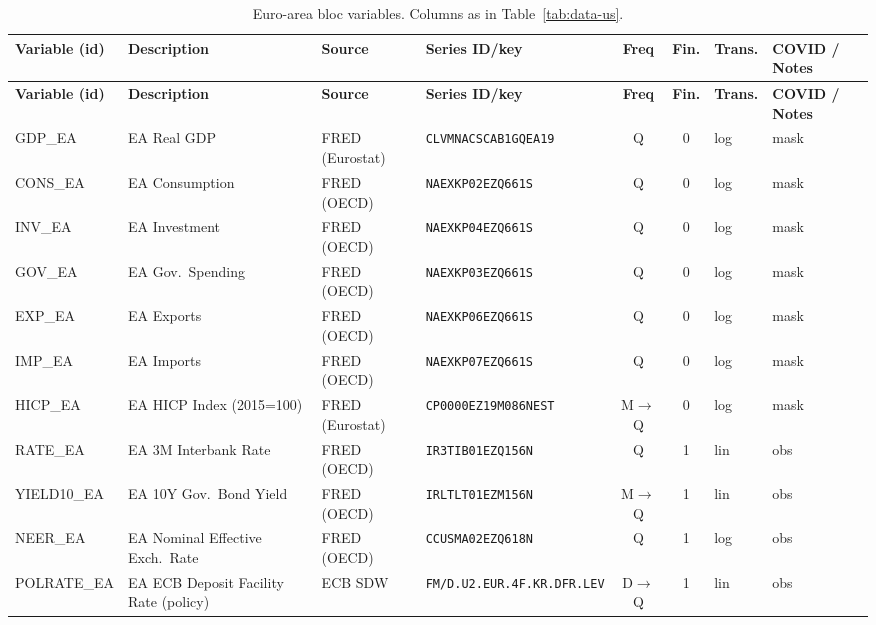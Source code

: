 {\footnotesize\setlength{\tabcolsep}{3.5pt}
\begin{longtable}{@{}>{\raggedright\arraybackslash}p{1.7cm} >{\raggedright\arraybackslash}p{2.7cm} >{\raggedright\arraybackslash}p{1.35cm} >{\raggedright\arraybackslash}p{2.55cm} c c >{\raggedright\arraybackslash}p{0.85cm} >{\raggedright\arraybackslash}p{2.75cm}@{}}
\caption{Euro-area bloc variables. Columns as in
Table~\ref{tab:data-us}.}\label{tab:data-ea}\\
\toprule
\textbf{Variable (id)} & \textbf{Description} & \textbf{Source} & \textbf{Series ID/key} & \textbf{Freq} & \textbf{Fin.} & \textbf{Trans.} & \textbf{COVID / Notes} \\
\midrule
\endfirsthead
\toprule
\textbf{Variable (id)} & \textbf{Description} & \textbf{Source} & \textbf{Series ID/key} & \textbf{Freq} & \textbf{Fin.} & \textbf{Trans.} & \textbf{COVID / Notes} \\
\midrule
\endhead
\bottomrule
\endfoot
GDP\_EA     & EA Real GDP & FRED (Eurostat) & \texttt{CLVMNACSCAB1GQEA19} & Q & 0 & log & mask \\
CONS\_EA    & EA Consumption & FRED (OECD) & \texttt{NAEXKP02EZQ661S} & Q & 0 & log & mask \\
INV\_EA     & EA Investment & FRED (OECD) & \texttt{NAEXKP04EZQ661S} & Q & 0 & log & mask \\
GOV\_EA     & EA Gov.\ Spending & FRED (OECD) & \texttt{NAEXKP03EZQ661S} & Q & 0 & log & mask \\
EXP\_EA     & EA Exports & FRED (OECD) & \texttt{NAEXKP06EZQ661S} & Q & 0 & log & mask \\
IMP\_EA     & EA Imports & FRED (OECD) & \texttt{NAEXKP07EZQ661S} & Q & 0 & log & mask \\
HICP\_EA    & EA HICP Index (2015=100) & FRED (Eurostat) & \texttt{CP0000EZ19M086NEST} & M$\to$Q & 0 & log & mask \\
RATE\_EA    & EA 3M Interbank Rate & FRED (OECD) & \texttt{IR3TIB01EZQ156N} & Q & 1 & lin & obs \\
YIELD10\_EA & EA 10Y Gov.\ Bond Yield & FRED (OECD) & \texttt{IRLTLT01EZM156N} & M$\to$Q & 1 & lin & obs \\
NEER\_EA    & EA Nominal Effective Exch.\ Rate & FRED (OECD) & \texttt{CCUSMA02EZQ618N} & Q & 1 & log & obs \\
POLRATE\_EA & EA ECB Deposit Facility Rate (policy) & ECB SDW & \texttt{FM/\allowbreak D.\allowbreak U2.\allowbreak EUR.\allowbreak 4F.\allowbreak KR.\allowbreak DFR.\allowbreak LEV} & D$\to$Q & 1 & lin & obs \\

\end{longtable}}
